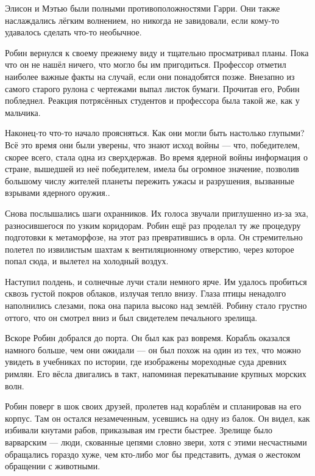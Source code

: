 \documentclass[a4paper,12pt]{book}
\begin{document}
\par
Элисон и Мэтью были полными противоположностями Гарри. Они также наслаждались лёгким волнением, но никогда не завидовали, если кому-то удавалось сделать что-то необычное.
\par
Робин вернулся к своему прежнему виду и тщательно просматривал планы. Пока что он не нашёл ничего, что могло бы им пригодиться. Профессор отметил наиболее важные факты на случай, если они понадобятся позже. Внезапно из самого старого рулона с чертежами выпал листок бумаги. Прочитав его, Робин побледнел. Реакция потрясённых студентов и профессора была такой же, как у мальчика.
\par
Наконец-то что-то начало проясняться. Как они могли быть настолько глупыми? Всё это время они были уверены, что знают исход войны — что, победителем, скорее всего, стала одна из сверхдержав. Во время ядерной войны информация о стране, вышедшей из неё победителем,  имела бы огромное значение, позволив большому числу жителей планеты пережить ужасы и разрушения, вызванные взрывами ядерного оружия..\\
\par
Снова послышались шаги охранников. Их голоса звучали приглушенно из-за эха, разносившегося по узким коридорам. Робин ещё раз проделал ту же процедуру подготовки к метаморфозе, на этот раз превратившись в орла. Он стремительно полетел по извилистым шахтам к вентиляционному отверстию, через которое попал сюда, и вылетел на холодный воздух.\\
\par
Наступил полдень, и солнечные лучи стали немного ярче. Им удалось пробиться сквозь густой покров облаков, излучая тепло внизу. Глаза птицы ненадолго наполнились слезами, пока она парила высоко над землёй. Робину стало грустно оттого, что он смотрел вниз и был свидетелем печального зрелища.\\
\par
Вскоре Робин добрался до порта. Он был как раз вовремя. Корабль оказался намного больше, чем они ожидали — он был похож на один из тех, что можно увидеть в учебниках по истории, где изображены мореходные суда древних римлян. Его вёсла двигались в такт, напоминая перекатывание крупных морских волн.
\par
Робин поверг в шок своих друзей, пролетев над кораблём и спланировав на его корпус. Там он остался незамеченным, усевшись на одну из балок. Он видел, как избивали кнутами рабов, приказывая им грести быстрее. Зрелище было варварским — люди, скованные цепями словно звери, хотя с этими несчастными обращались гораздо хуже, чем кто-либо мог бы представить, думая о жестоком обращении с животными.
\end{document}
